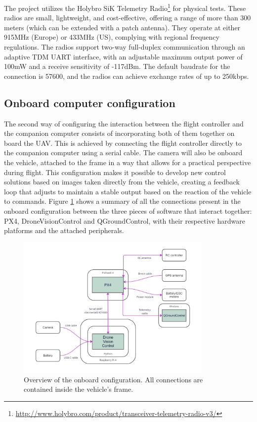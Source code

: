 The project utilizes the Holybro SiK Telemetry Radio\footnote{\url{http://www.holybro.com/product/transceiver-telemetry-radio-v3/}} for physical tests. These radios are small, lightweight, and cost-effective, offering a range of more than 300 meters (which can be extended with a patch antenna). They operate at either 915MHz (Europe) or 433MHz (US), complying with regional frequency regulations. The radios support two-way full-duplex communication through an adaptive TDM UART interface, with an adjustable maximum output power of 100mW and a receive sensitivity of -117dBm. The default baudrate for the connection is 57600, and the radios can achieve exchange rates of up to 250kbps.


\subsection{Onboard computer configuration}
\label{subsec:onboard}

The second way of configuring the interaction between the flight controller and the companion computer consists of incorporating both of them together on board the UAV.
This is achieved by connecting the flight controller directly to the companion computer using a serial cable.
The camera will also be onboard the vehicle, attached to the frame in a way that allows for a practical perspective during flight.
This configuration makes it possible to develop new control solutions based on images taken directly from the vehicle, creating a feedback loop that adjusts to maintain a stable output based on the reaction of the vehicle to commands.
Figure \ref{fig:onboard-config} shows a summary of all the connections present in the onboard configuration between the three pieces of software that interact together: PX4, DroneVisionControl and QGroundControl, with their respective hardware platforms and the attached peripherals.

\begin{figure}[b!]
  \centering
  \includegraphics[width=0.85\textwidth,keepaspectratio]{img/onboard-diagram.jpg}
  \caption{Overview of the onboard configuration. All connections are contained inside the vehicle's frame.}
  \label{fig:onboard-config}
\end{figure}


